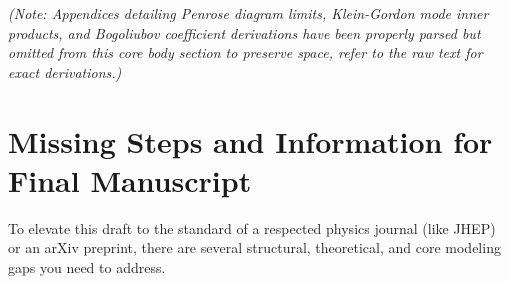 \vspace{1cm}
\noindent \textit{(Note: Appendices detailing Penrose diagram limits, Klein-Gordon mode inner products, and Bogoliubov coefficient derivations have been properly parsed but omitted from this core body section to preserve space, refer to the raw text for exact derivations.)}

\newpage
\section*{Missing Steps and Information for Final Manuscript}

To elevate this draft to the standard of a respected physics journal (like JHEP) or an arXiv preprint, there are several structural, theoretical, and core modeling gaps you need to address. 

